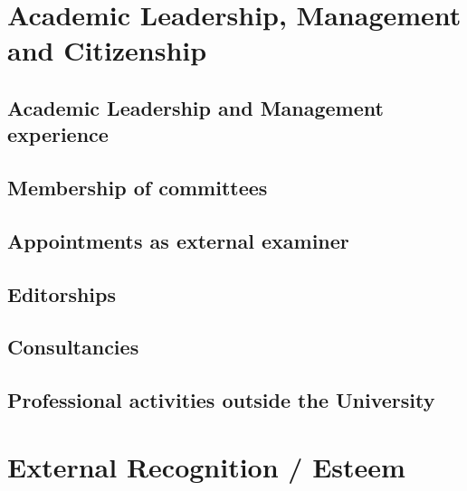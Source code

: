 \documentclass[11pt,a4paper]{moderncv}
\begin{document}
\section{Academic Leadership, Management and Citizenship}

\subsection{Academic Leadership and Management experience}
\vspace{-1.75em}

\subsection{Membership of committees}
\vspace{-1.75em}

\subsection{Appointments as external examiner}
\vspace{-1.75em}

\subsection{Editorships}
\vspace{-1.75em}

\subsection{Consultancies}
\vspace{-1.75em}

\subsection{Professional activities outside the University}
\vspace{-1.75em}

\section{External Recognition / Esteem}
\end{document}
